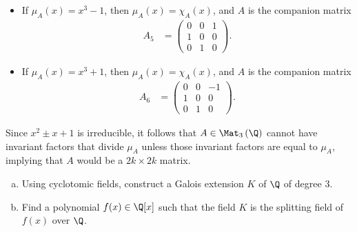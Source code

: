 \documentclass[10pt]{mypackage}
\begin{document}
\begin{solution}
\begin{enumerate}[(a)]
\begin{itemize}
          \begin{align*}
            A_3 &= \begin{pmatrix}1 & 0 & 0 \\ 0 & 0 & 1 \\ 0 & 1 & 0\end{pmatrix}\\
            A_4 &= \begin{pmatrix}-1 & 0 & 0 \\ 0 & 0 & 1\\ 0 & 1 & 0\end{pmatrix}.
          \end{align*}
        \item If $\mu_A(x) = x^3 - 1$, then $\mu_A(x) = \chi_A(x)$, and $A$ is the companion matrix
          \begin{align*}
            A_5 &= \begin{pmatrix}0 & 0 & 1 \\ 1 & 0 & 0 \\ 0 & 1 & 0\end{pmatrix}.
          \end{align*}
        \item If $\mu_A(x) = x^3 + 1$, then $\mu_A(x) = \chi_A(x)$, and $A$ is the companion matrix
          \begin{align*}
            A_6 &= \begin{pmatrix}0 & 0 & -1 \\ 1 & 0 & 0 \\ 0 & 1 & 0\end{pmatrix}.
          \end{align*}
      \end{itemize}
      Since $x^2 \pm x + 1$ is irreducible, it follows that $A\in \Mat_3\left( \Q \right)$ cannot have invariant factors that divide $\mu_A$ unless those invariant factors are equal to $\mu_A$, implying that $A$ would be a $2k\times 2k$ matrix. 
  \end{enumerate}
\end{solution}
\begin{problem}[Problem 7]\hfill
  \begin{enumerate}[(a)]
    \item Using cyclotomic fields, construct a Galois extension $K$ of $\Q$ of degree $3$.
    \item Find a polynomial $f(x)\in \Q[x]$ such that the field $K$ is the splitting field of $f(x)$ over $\Q$.
  \end{enumerate}
\end{problem}
\end{document}
